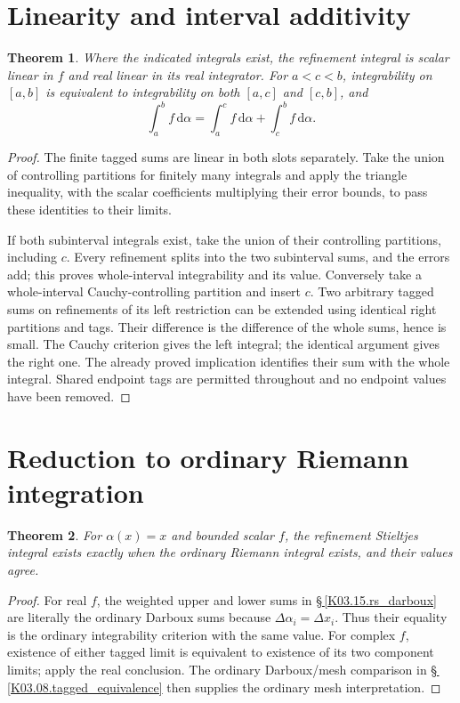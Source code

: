 \documentclass[11pt,oneside,a4paper]{book}
\newtheorem{theorem}{Theorem}[chapter]
\theoremstyle{definition}
\theoremstyle{remark}
\newcommand{\dd}{\,\mathrm d}
\newcommand{\KEntry}[2]{\Needspace{7\baselineskip}\section{#2}\label{#1}{\small\sffamily\color{black!60}\detokenize{#1}}\par}
\newcommand{\KRef}[1]{\hyperref[#1]{\S\,\ref*{#1}}}
\begin{document}
\KEntry{K03.15.rs_algebra}{Linearity and interval additivity}
\begin{theorem}
Where the indicated integrals exist, the refinement integral is scalar linear in $f$ and real linear in its real integrator. For $a<c<b$, integrability on $[a,b]$ is equivalent to integrability on both $[a,c]$ and $[c,b]$, and
\[\int_a^b f\dd\alpha=\int_a^c f\dd\alpha+\int_c^b f\dd\alpha.\]
\end{theorem}
\begin{proof}
The finite tagged sums are linear in both slots separately. Take the union of controlling partitions for finitely many integrals and apply the triangle inequality, with the scalar coefficients multiplying their error bounds, to pass these identities to their limits.

If both subinterval integrals exist, take the union of their controlling partitions, including $c$. Every refinement splits into the two subinterval sums, and the errors add; this proves whole-interval integrability and its value. Conversely take a whole-interval Cauchy-controlling partition and insert $c$. Two arbitrary tagged sums on refinements of its left restriction can be extended using identical right partitions and tags. Their difference is the difference of the whole sums, hence is small. The Cauchy criterion gives the left integral; the identical argument gives the right one. The already proved implication identifies their sum with the whole integral. Shared endpoint tags are permitted throughout and no endpoint values have been removed.
\end{proof}

\KEntry{K03.15.rs_ordinary}{Reduction to ordinary Riemann integration}
\begin{theorem}
For $\alpha(x)=x$ and bounded scalar $f$, the refinement Stieltjes integral exists exactly when the ordinary Riemann integral exists, and their values agree.
\end{theorem}
\begin{proof}
For real $f$, the weighted upper and lower sums in \KRef{K03.15.rs_darboux} are literally the ordinary Darboux sums because $\Delta\alpha_i=\Delta x_i$. Thus their equality is the ordinary integrability criterion with the same value. For complex $f$, existence of either tagged limit is equivalent to existence of its two component limits; apply the real conclusion. The ordinary Darboux/mesh comparison in \KRef{K03.08.tagged_equivalence} then supplies the ordinary mesh interpretation.
\end{proof}
\end{document}
